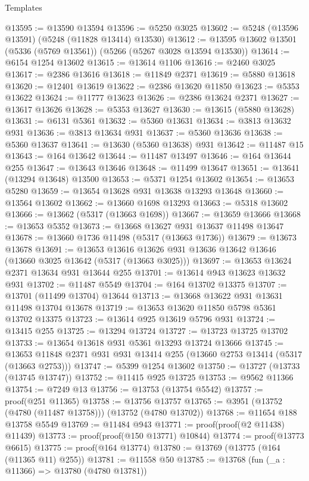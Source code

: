 \begin{lexlean}{Templates}
\begin{coremodule}
@13595 := @13590 @13594
@13596 := @5250 @3025
@13602 := @5248 (@13596 @13591) (@5248 (@11828 @13414) @13530)
@13612 := @13595 @13602 @13501 (@5336 (@5769 @13561)) (@5266 (@5267 @3028 @13594 @13530))
@13614 := @6154 @1254 @13602
@13615 := @13614 @1106
@13616 := @2460 @3025
@13617 := @2386 @13616
@13618 := @11849 @2371
@13619 := @5880 @13618
@13620 := @12401 @13619
@13622 := @2386 @13620 @11850
@13623 := @5353 @13622
@13624 := @11777 @13623
@13626 := @2386 @13624 @2371
@13627 := @13617 @13626
@13628 := @5353 @13627
@13630 := @13615 (@5880 @13628)
@13631 := @6131 @5361
@13632 := @5360 @13631
@13634 := @3813 @13632 @931
@13636 := @3813 @13634 @931
@13637 := @5360 @13636
@13638 := @5360 @13637
@13641 := @13630 (@5360 @13638) @931
@13642 := @11487 @15
@13643 := @164 @13642
@13644 := @11487 @13497
@13646 := @164 @13644 @255
@13647 := @13643 @13646
@13648 := @11499 @13647
@13651 := @13641 (@13294 @13648) @13500
@13653 := @5371 @1254 @13602
@13654 := @13653 @5280
@13659 := @13654 @13628 @931 @13638 @13293 @13648
@13660 := @13564 @13602
@13662 := @13660 @1698 @13293
@13663 := @5318 @13602
@13666 := @13662 (@5317 (@13663 @1698))
@13667 := @13659 @13666
@13668 := @13653 @5352
@13673 := @13668 @13627 @931 @13637 @11498 @13647
@13678 := @13660 @1736 @11498 (@5317 (@13663 @1736))
@13679 := @13673 @13678
@13691 := @13653
    @13616
    @13626
    @931
    @13636
    @13642
    @13646
    (@13660 @3025 @13642 (@5317 (@13663 @3025)))
@13697 := @13653 @13624 @2371 @13634 @931 @13644 @255
@13701 := @13614 @943 @13623 @13632 @931
@13702 := @11487 @5549
@13704 := @164 @13702 @13375
@13707 := @13701 (@11499 @13704) @13644
@13713 := @13668 @13622 @931 @13631 @11498 @13704 @13678
@13719 := @13653 @13620 @11850 @5798 @5361 @13702 @13375
@13723 := @13614 @925 @13619 @5796 @931
@13724 := @13415 @255
@13725 := @13294 @13724
@13727 := @13723 @13725 @13702
@13733 := @13654 @13618 @931 @5361 @13293 @13724 @13666
@13745 := @13653 @11848 @2371 @931 @931 @13414 @255 (@13660 @2753 @13414 (@5317 (@13663 @2753)))
@13747 := @5399 @1254 @13602
@13750 := @13727 (@13733 (@13745 @13747))
@13752 := @11415 @925 @13725
@13753 := @9562 @11366
@13754 := @7249 @13
@13756 := @13753 (@13754 @5542)
@13757 := proof(@251 @11365)
@13758 := @13756 @13757
@13765 := @3951 (@13752 (@4780 (@11487 @13758))) (@13752 (@4780 @13702))
@13768 := @11654 @188 @13758 @5549
@13769 := @11484 @943
@13771 := proof(proof(@2 @11438) @11439)
@13773 := proof(proof(@150 @13771) @10844)
@13774 := proof(@13773 @6615)
@13775 := proof(@164 @13774)
@13780 := @13769 (@13775 (@164 (@11365 @11) @255))
@13781 := @11558 @50
@13785 := @13768 (fun (_a : @11366) => @13780 (@4780 @13781))

\end{coremodule}
\end{lexlean}

